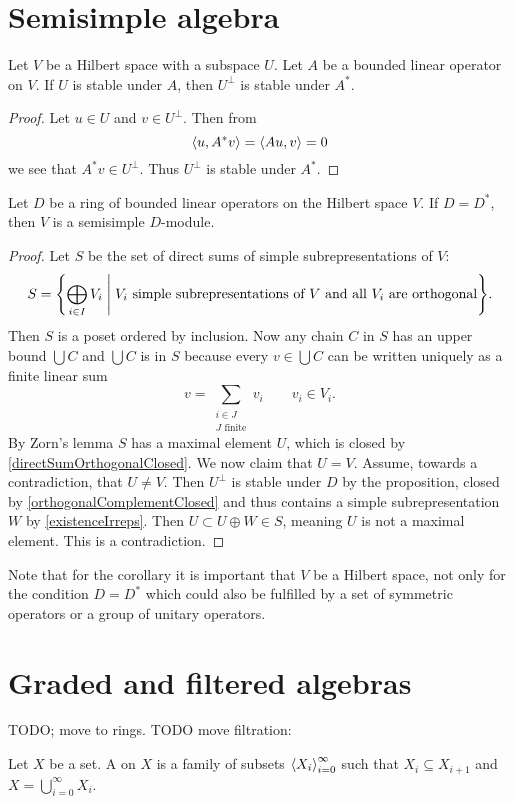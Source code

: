 \section{Semisimple algebra}
\begin{proposition}
Let $V$ be a Hilbert space with a subspace $U$. Let $A$ be a bounded linear operator on $V$. If $U$ is stable under $A$, then $U^\perp$ is stable under $A^*$.
\end{proposition}
\begin{proof}
Let $u\in U$ and $v\in U^\perp$. Then from
\[ \left\langle u, A^*v \right\rangle = \left\langle Au,v \right\rangle = 0 \]
we see that $A^*v \in U^\perp$. Thus $U^\perp$ is stable under $A^*$.
\end{proof}
\begin{corollary}
Let $D$ be a ring of bounded linear operators on the Hilbert space $V$. If $D=D^*$, then $V$ is a semisimple $D$-module.
\end{corollary}
\begin{proof}
Let $S$ be the set of direct sums of simple subrepresentations of $V$:
\[ S = \setbuilder{\bigoplus_{i\in I}V_i }{\text{$V_i$ simple subrepresentations of $V$ and all $V_i$ are orthogonal}}. \]
Then $S$ is a poset ordered by inclusion. Now any chain $C$ in $S$ has an upper bound $\bigcup C$ and $\bigcup C$ is in $S$ because every $v\in\bigcup C$ can be written uniquely as a finite linear sum
\[ v = \sum_{\substack{i\in J\\ \text{$J$ finite}}} v_i \qquad v_i\in V_i. \]
By Zorn's lemma $S$ has a maximal element $U$, which is closed by \ref{directSumOrthogonalClosed}. We now claim that $U=V$. Assume, towards a contradiction, that $U\neq V$. Then $U^\perp$ is stable under $D$ by the proposition, closed by \ref{orthogonalComplementClosed} and thus contains a simple subrepresentation $W$ by \ref{existenceIrreps}. Then $U\subset U\oplus W \in S$, meaning $U$ is not a maximal element. This is a contradiction.
\end{proof}
Note that for the corollary it is important that $V$ be a Hilbert space, not only for the condition $D=D^*$ which could also be fulfilled by a set of symmetric operators or a group of unitary operators.


\section{Graded and filtered algebras}
TODO; move to rings. TODO move filtration:
\begin{definition}
Let $X$ be a set. A  on $X$ is a family of subsets $\left\langle X_i \right\rangle_{i=0}^\infty$ such that $X_i \subseteq X_{i+1}$ and $X = \bigcup_{i=0}^\infty X_i$.
\end{definition}

